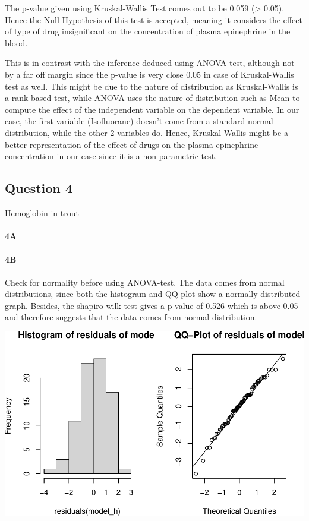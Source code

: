 \documentclass[
]{article}
\begin{document}
The p-value given using Kruskal-Wallis Test comes out to be 0.059
(\textgreater{} 0.05). Hence the Null Hypothesis of this test is
accepted, meaning it considers the effect of type of drug insignificant
on the concentration of plasma epinephrine in the blood.

This is in contrast with the inference deduced using ANOVA test,
although not by a far off margin since the p-value is very close 0.05 in
case of Kruskal-Wallis test as well. This might be due to the nature of
distribution as Kruskal-Wallis is a rank-based test, while ANOVA uses
the nature of distribution such as Mean to compute the effect of the
independent variable on the dependent variable. In our case, the first
variable (Isofluorane) doesn't come from a standard normal distribution,
while the other 2 variables do. Hence, Kruskal-Wallis might be a better
representation of the effect of drugs on the plasma epinephrine
concentration in our case since it is a non-parametric test.

\hypertarget{question-4}{%
\subsection{Question 4}\label{question-4}}

Hemoglobin in trout

\hypertarget{a-3}{%
\paragraph{\texorpdfstring{\textbf{4A}}{4A}}\label{a-3}}

\hypertarget{b-3}{%
\paragraph{\texorpdfstring{\textbf{4B}}{4B}}\label{b-3}}

Check for normality before using ANOVA-test. The data comes from normal
distributions, since both the histogram and QQ-plot show a normally
distributed graph. Besides, the shapiro-wilk test gives a p-value of
0.526 which is above 0.05 and therefore suggests that the data comes
from normal distribution.

\includegraphics{assignment1_group75_final_files/figure-latex/unnamed-chunk-27-1.pdf}
\end{document}
